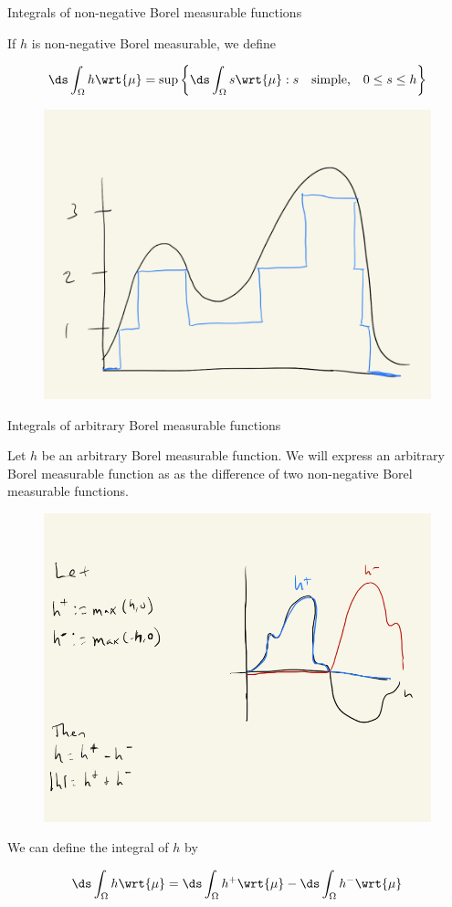 \documentclass[10pt]{beamer}
\begin{document}
\begin{frame}{Integrals of non-negative Borel measurable functions}
\begin{definition}

If $h$ is non-negative Borel measurable, we define 

\[  \ds\int_{\Omega} h \wrt{\mu} = \sup \bigg\{ \ds\int_{\Omega} s \wrt{\mu} : s \quad \text{simple,} \quad 0 \leq s \leq h  \bigg\} \]
\label{def:integral_of_non_negative_Borel_measurable_function}
\end{definition}


\begin{figure}[H]
\centering
\includegraphics[width=.4\textwidth]{images/simple_function_approximating_non_negative_function}	
\end{figure}

\end{frame}

\begin{frame}{Integrals of arbitrary Borel measurable functions}

Let $h$ be an arbitrary Borel measurable function.   We will express an arbitrary Borel measurable function as as the difference of two non-negative Borel measurable functions.


\begin{figure}[H]
\centering
\includegraphics[width=.4\textwidth]{images/arbitrary_borel_measurable_functions_in_terms_of_nonnegative_borel_measurable_functions}
\end{figure}

We can define the integral of $h$ by 

\[ \ds\int_\Omega h \wrt{\mu} = \ds\int_\Omega h^+ \wrt{\mu} - \ds\int_\Omega h^- \wrt{\mu} \]

\vfill


\end{frame}

\end{document}
